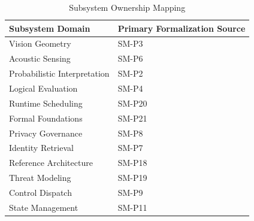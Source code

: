 \documentclass[conference]{IEEEtran}
\begin{document}
\begin{table}[htbp]
\caption{Subsystem Ownership Mapping}
\label{tab:subsystem_mapping}
\centering
\begin{tabular}{@{}ll@{}}
\toprule
\textbf{Subsystem Domain} & \textbf{Primary Formalization Source} \\
\midrule
Vision Geometry & SM-P3 \\
Acoustic Sensing & SM-P6 \\
Probabilistic Interpretation & SM-P2 \\
Logical Evaluation & SM-P4 \\
Runtime Scheduling & SM-P20 \\
Formal Foundations & SM-P21 \\
Privacy Governance & SM-P8 \\
Identity Retrieval & SM-P7 \\
Reference Architecture & SM-P18 \\
Threat Modeling & SM-P19 \\
Control Dispatch & SM-P9 \\
State Management & SM-P11 \\
\bottomrule
\end{tabular}
\end{table}
\end{document}
